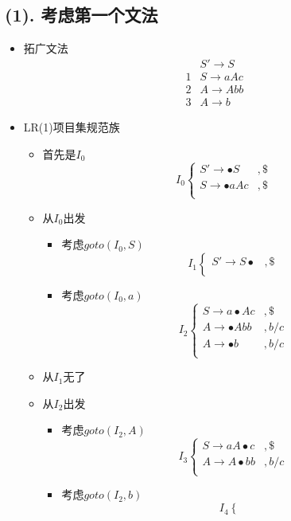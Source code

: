 \documentclass[UTF8]{article}
\newcommand{\blt}{\bullet}
\begin{document}
\subsection*{(1). 考虑第一个文法}
\begin{itemize}
\item 拓广文法
	$$\begin{array}{ll}
	  & S'\rightarrow S\\
	1 & S\rightarrow aAc\\
	2 & A\rightarrow Abb\\
	3 & A\rightarrow b
	\end{array}$$
\item LR(1)项目集规范族
	\begin{itemize}
	\item 首先是$I_0$
		$$I_0\left\{\begin{array}{ll}
		S'\rightarrow \blt S & ,\$ \\
		S\rightarrow \blt aAc & ,\$ \\
		\end{array}\right.$$
	\item 从$I_0$出发
		\begin{itemize}
		\item 考虑$goto(I_0,S)$
			$$I_1\left\{\begin{array}{ll}
			S'\rightarrow  S\blt & ,\$\\
			\end{array}\right.$$
		\item 考虑$goto(I_0,a)$
			$$I_2\left\{\begin{array}{ll}
			S\rightarrow a\blt Ac & ,\$ \\
			A\rightarrow \blt Abb & , b/c\\
			A\rightarrow \blt b & , b/c\\
			\end{array}\right.$$
		\end{itemize}
	\item 从$I_1$无了
	\item 从$I_2$出发
		\begin{itemize}
		\item 考虑$goto(I_2,A)$
			$$I_3\left\{\begin{array}{ll}
			S\rightarrow aA\blt c & ,\$ \\
			A\rightarrow A\blt bb & , b/c\\
			\end{array}\right.$$
		\item 考虑$goto(I_2,b)$
			$$I_4\left\{\begin{array}{ll}

\end{array}$$
\end{itemize}
\end{itemize}
\end{itemize}
\end{document}
